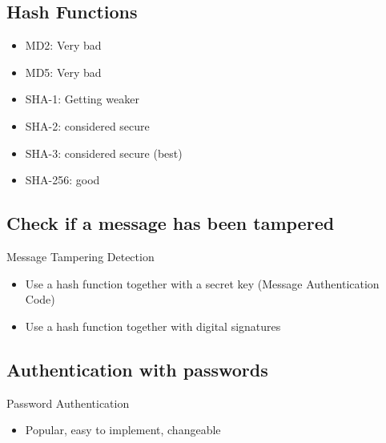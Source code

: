 \subsection{Hash Functions}

\begin{remark}
    \begin{itemize}
        \item MD2: Very bad
        \item MD5: Very bad
        \item SHA-1: Getting weaker
        \item SHA-2: considered secure
        \item SHA-3: considered secure (best)
        \item SHA-256: good
    \end{itemize}
\end{remark}


\subsection{Check if a message has been tampered}

\begin{concept}{Message Tampering Detection}\\
    \begin{itemize}
        \item Use a hash function together with a secret key (Message Authentication Code)
        \item Use a hash function together with digital signatures
    \end{itemize}
\end{concept}

\subsection{Authentication with passwords}

\begin{concept}{Password Authentication}\\
    \begin{itemize}
        \item Popular, easy to implement, changeable
    \end{itemize}
\end{concept}

